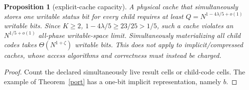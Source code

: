 \documentclass[11pt]{article}
\newtheorem{proposition}{Proposition}
\begin{document}
\begin{proposition}[explicit-cache capacity]\label{cache}
A physical cache that simultaneously stores one writable status bit for every child requires at least \(Q=N^{1-4\lambda/5+o(1)}\) writable bits. Since \(K\ge2\), \(1-4\lambda/5\ge23/25>1/5\), such a cache violates an \(N^{1/5+o(1)}\) all-phase writable-space limit. Simultaneously materializing all child codes takes \(\Theta(N^{1+\zeta})\) writable bits. This \emph{does not} apply to implicit/compressed caches, whose access algorithms and correctness must instead be charged.
\end{proposition}
\begin{proof}Count the declared simultaneously live result cells or child-code cells. The example of Theorem~\ref{port} has a one-bit implicit representation, namely \(b\).\end{proof}
\end{document}
